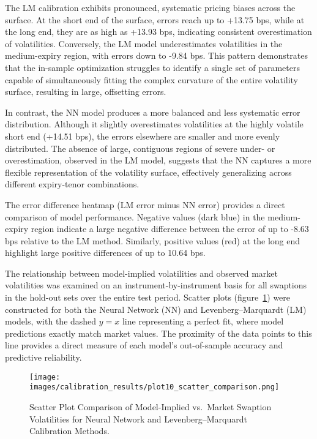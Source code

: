 The LM calibration exhibits pronounced, systematic pricing biases across the surface. At the short end of the surface, errors reach up to +13.75 bps, while at the long end, they are as high as +13.93 bps, indicating consistent overestimation of volatilities. Conversely, the LM model underestimates volatilities in the medium-expiry region, with errors down to -9.84 bps. This pattern demonstrates that the in-sample optimization struggles to identify a single set of parameters capable of simultaneously fitting the complex curvature of the entire volatility surface, resulting in large, offsetting errors.

In contrast, the NN model produces a more balanced and less systematic error distribution. Although it slightly overestimates volatilities at the highly volatile short end (+14.51 bps), the errors elsewhere are smaller and more evenly distributed. The absence of large, contiguous regions of severe under- or overestimation, observed in the LM model, suggests that the NN captures a more flexible representation of the volatility surface, effectively generalizing across different expiry-tenor combinations.

The error difference heatmap (LM error minus NN error) provides a direct comparison of model performance. Negative values (dark blue) in the medium-expiry region indicate a large negative difference between the error of up to -8.63 bps relative to the LM method. Similarly, positive values (red) at the long end highlight large positive differences of up to 10.64 bps.

The relationship between model-implied volatilities and observed market volatilities was examined on an instrument-by-instrument basis for all swaptions in the hold-out sets over the entire test period. Scatter plots (figure~\ref{fig:scatter_comparison}) were constructed for both the Neural Network (NN) and Levenberg–Marquardt (LM) models, with the dashed \(y=x\) line representing a perfect fit, where model predictions exactly match market values. The proximity of the data points to this line provides a direct measure of each model's out-of-sample accuracy and predictive reliability.

\begin{figure}[H]
	\centering
	\texttt{[image: images/calibration\_results/plot10\_scatter\_comparison.png]}
	\caption{Scatter Plot Comparison of Model-Implied vs.\ Market Swaption Volatilities for Neural Network and Levenberg--Marquardt Calibration Methods.}
	\label{fig:scatter_comparison}
\end{figure}


